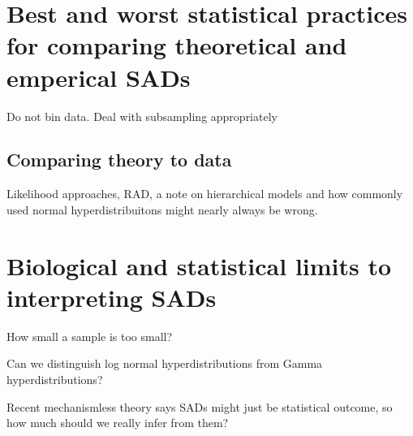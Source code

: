 \documentclass[12pt]{article}
\begin{document}
\section{Best and worst statistical practices for comparing
  theoretical and emperical SADs}
\label{sec:statPrac}

Do not bin data. Deal with subsampling appropriately

\subsection{Comparing theory to data}
Likelihood approaches, RAD, a note on hierarchical models and how
commonly used normal hyperdistribuitons might nearly always be wrong.

\section{Biological and statistical limits to interpreting SADs}

How small a sample is too small?

Can we distinguish log normal hyperdistributions from Gamma
hyperdistributions?

Recent mechanismless theory says SADs might just be statistical
outcome, so how much should we really infer from them?
\end{document}
